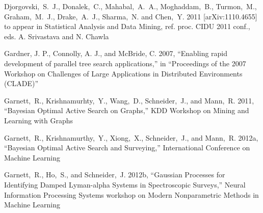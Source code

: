 \documentclass[prd,nofootbib,floatfix,11pt,tightenlines]{revtex4}
\begin{document}
\begin{thebibliography}{99}




Djorgovski,~S.~J., Donalek,~C., Mahabal,~A.~A., Moghaddam,~B., Turmon,~M.,
Graham,~M.~J., Drake,~A.~J., Sharma,~N. and Chen,~Y. 2011
[arXiv:1110.4655] to appear in Statistical Analysis and Data Mining, ref. proc.
CIDU 2011 conf., eds. A. Srivastava and N. Chawla


Gardner, J. P., Connolly, A. J., and McBride, C. 2007,
``Enabling rapid development of parallel tree search applications,''
in ``Proceedings of the 2007 Workshop on Challenges of Large Applications in Distributed
Environments (CLADE)''

Garnett,~R., Krishnamurhty,~Y., Wang,~D., Schneider,~J., and Mann,~R. 2011,
``Bayesian Optimal Active Search on Graphs,'' KDD Workshop on Mining and
Learning with Graphs

Garnett,~R., Krishnamurthy,~Y., Xiong,~X., Schneider,~J., and Mann,~R. 2012a,
``Bayesian Optimal Active Search and Surveying,'' International Conference on
Machine Learning

Garnett,~R., Ho,~S., and Schneider,~J. 2012b,
``Gaussian Processes for Identifying Damped Lyman-alpha Systems in Spectroscopic
Surveys,'' Neural Information Processing Systems 
workshop on Modern Nonparametric Methods in Machine Learning


\end{thebibliography}
\end{document}
